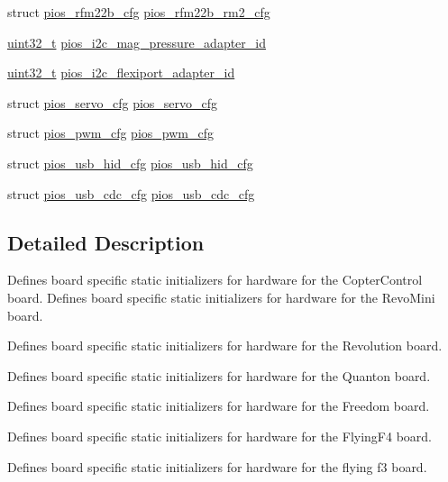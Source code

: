 \begin{DoxyCompactItemize}
\item 
struct \hyperlink{structpios__rfm22b__cfg}{pios\-\_\-rfm22b\-\_\-cfg} \hyperlink{group___tau_labs_core_gacbc9b46e8d0d3813992110ba271f8781}{pios\-\_\-rfm22b\-\_\-rm2\-\_\-cfg}
\item 
\hyperlink{stdint_8h_a435d1572bf3f880d55459d9805097f62}{uint32\-\_\-t} \hyperlink{group___tau_labs_core_ga0bc1cddc7bfac02e5a765f1ff09ad29f}{pios\-\_\-i2c\-\_\-mag\-\_\-pressure\-\_\-adapter\-\_\-id}
\item 
\hyperlink{stdint_8h_a435d1572bf3f880d55459d9805097f62}{uint32\-\_\-t} \hyperlink{group___tau_labs_core_ga20b68de0b754d943d653d816aad86148}{pios\-\_\-i2c\-\_\-flexiport\-\_\-adapter\-\_\-id}
\item 
struct \hyperlink{structpios__servo__cfg}{pios\-\_\-servo\-\_\-cfg} \hyperlink{group___tau_labs_core_ga57a87ef16d7949a9cc3589efc8d88a28}{pios\-\_\-servo\-\_\-cfg}
\item 
struct \hyperlink{structpios__pwm__cfg}{pios\-\_\-pwm\-\_\-cfg} \hyperlink{group___tau_labs_core_ga7587f8e174df90bef8cec1edfa9e14c1}{pios\-\_\-pwm\-\_\-cfg}
\item 
struct \hyperlink{structpios__usb__hid__cfg}{pios\-\_\-usb\-\_\-hid\-\_\-cfg} \hyperlink{group___tau_labs_core_ga3665f6d3a2cccc431b55b9432291e94c}{pios\-\_\-usb\-\_\-hid\-\_\-cfg}
\item 
struct \hyperlink{structpios__usb__cdc__cfg}{pios\-\_\-usb\-\_\-cdc\-\_\-cfg} \hyperlink{group___tau_labs_core_ga05cc3e449d417c7f9097d2659e6f5ca3}{pios\-\_\-usb\-\_\-cdc\-\_\-cfg}
\end{DoxyCompactItemize}


\subsection{Detailed Description}
Defines board specific static initializers for hardware for the Copter\-Control board. Defines board specific static initializers for hardware for the Revo\-Mini board.

Defines board specific static initializers for hardware for the Revolution board.

Defines board specific static initializers for hardware for the Quanton board.

Defines board specific static initializers for hardware for the Freedom board.

Defines board specific static initializers for hardware for the Flying\-F4 board.

Defines board specific static initializers for hardware for the flying f3 board.

